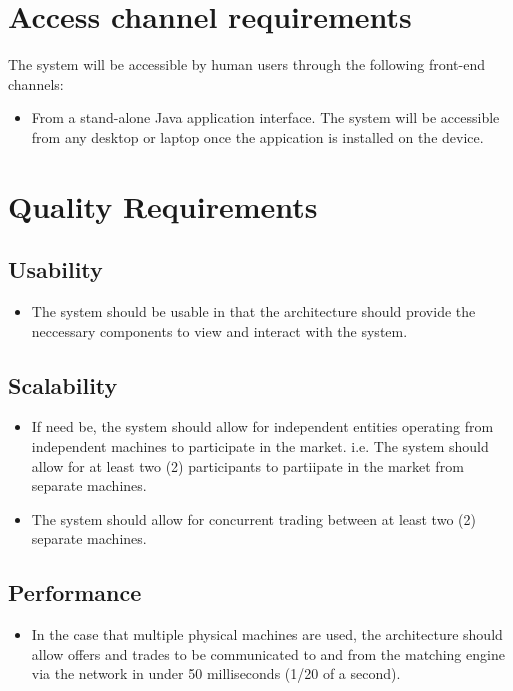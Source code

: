 \documentclass[12pt]{article}
\begin{document}
	\section{Access channel requirements}
	The system will be accessible by human users through the following front-end channels:
	\begin{itemize}
	\item From a stand-alone Java application interface. The system will be accessible from any desktop or laptop once the appication is installed on the device.
	\end{itemize}
	
	\section{Quality Requirements}
		\subsection{Usability}
		\begin{itemize}
		\item The system should be usable in that the architecture should provide the neccessary components to view and interact with the system.
		\end{itemize}
		\subsection{Scalability}
		\begin{itemize}
		\item If need be, the system should allow for independent entities operating from independent machines to participate in the market. i.e. The system should allow for at least two (2) participants to partiipate in the market from separate machines.
		\item The system should allow for concurrent trading between at least two (2) separate machines.
		\end{itemize}
		\subsection{Performance}
		\begin{itemize}
		\item In the case that multiple physical machines are used, the architecture should allow offers and trades to be communicated to and from the matching engine via the network in under 50 milliseconds (1/20 of a second). 
		\end{itemize}
\end{document}

